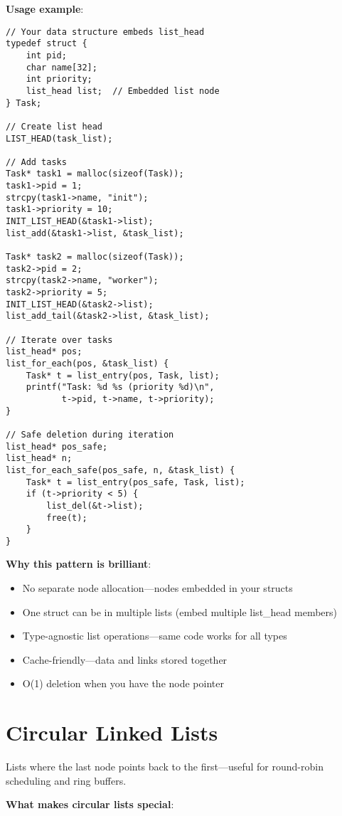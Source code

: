 \textbf{Usage example}:

\begin{lstlisting}
// Your data structure embeds list_head
typedef struct {
    int pid;
    char name[32];
    int priority;
    list_head list;  // Embedded list node
} Task;

// Create list head
LIST_HEAD(task_list);

// Add tasks
Task* task1 = malloc(sizeof(Task));
task1->pid = 1;
strcpy(task1->name, "init");
task1->priority = 10;
INIT_LIST_HEAD(&task1->list);
list_add(&task1->list, &task_list);

Task* task2 = malloc(sizeof(Task));
task2->pid = 2;
strcpy(task2->name, "worker");
task2->priority = 5;
INIT_LIST_HEAD(&task2->list);
list_add_tail(&task2->list, &task_list);

// Iterate over tasks
list_head* pos;
list_for_each(pos, &task_list) {
    Task* t = list_entry(pos, Task, list);
    printf("Task: %d %s (priority %d)\n",
           t->pid, t->name, t->priority);
}

// Safe deletion during iteration
list_head* pos_safe;
list_head* n;
list_for_each_safe(pos_safe, n, &task_list) {
    Task* t = list_entry(pos_safe, Task, list);
    if (t->priority < 5) {
        list_del(&t->list);
        free(t);
    }
}
\end{lstlisting}

\textbf{Why this pattern is brilliant}:

\begin{itemize}
    \item No separate node allocation—nodes embedded in your structs
    \item One struct can be in multiple lists (embed multiple list\_head members)
    \item Type-agnostic list operations—same code works for all types
    \item Cache-friendly—data and links stored together
    \item O(1) deletion when you have the node pointer
\end{itemize}

\section{Circular Linked Lists}

Lists where the last node points back to the first—useful for round-robin scheduling and ring buffers.

\textbf{What makes circular lists special}:

